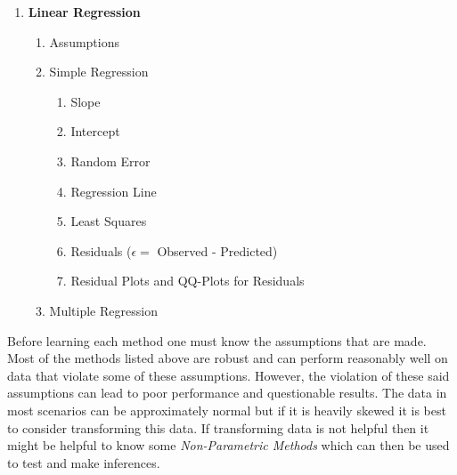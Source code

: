 \documentclass[11pt]{article}
\begin{document}
\begin{enumerate}
\begin{enumerate}
		\end{enumerate}
		\item \textbf{Linear Regression}
		\begin{enumerate}
			\item Assumptions
			\item Simple Regression
			\begin{enumerate}
				\item Slope
				\item Intercept
				\item Random Error
				\item Regression Line
				\item Least Squares
				\item Residuals ($\epsilon = $ Observed - Predicted)
				\item Residual Plots and QQ-Plots for Residuals
			\end{enumerate}
			\item Multiple Regression
		\end{enumerate}
	\end{enumerate}
	Before learning each method one must know the assumptions that are made. Most of the methods listed above are robust and can perform reasonably well on data that violate some of these assumptions. However, the violation of these said assumptions can lead to poor performance and questionable results. The data in most scenarios can be approximately normal but if it is heavily skewed it is best to consider transforming this data. If transforming data is not helpful then it might be helpful to know some \textit{Non-Parametric Methods} which can then be used to test and make inferences.
\end{document}
